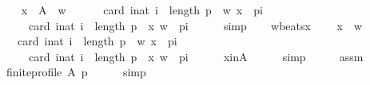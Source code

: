 \begin{isabellebody}
\ \ \isamarkupfalse%
\isanewline
\ \ \ \ {\isachardoublequoteopen}{\isacharparenleft}{\kern0pt}{\isasymforall}x\ {\isasymin}\ A\ {\isacharminus}{\kern0pt}\ {\isacharbraceleft}{\kern0pt}w{\isacharbraceright}{\kern0pt}{\isachardot}{\kern0pt}\isanewline
\ \ \ \ \ \ card\ {\isacharbraceleft}{\kern0pt}i{\isacharcolon}{\kern0pt}{\isacharcolon}{\kern0pt}nat{\isachardot}{\kern0pt}\ i\ {\isacharless}{\kern0pt}\ length\ p\ {\isasymand}\ {\isacharparenleft}{\kern0pt}w{\isacharcomma}{\kern0pt}\ x{\isacharparenright}{\kern0pt}\ {\isasymin}\ p{\isacharbang}{\kern0pt}i{\isacharbraceright}{\kern0pt}\ {\isacharless}{\kern0pt}\isanewline
\ \ \ \ \ \ \ \ card\ {\isacharbraceleft}{\kern0pt}i{\isacharcolon}{\kern0pt}{\isacharcolon}{\kern0pt}nat{\isachardot}{\kern0pt}\ i\ {\isacharless}{\kern0pt}\ length\ p\ {\isasymand}\ {\isacharparenleft}{\kern0pt}x{\isacharcomma}{\kern0pt}\ w{\isacharparenright}{\kern0pt}\ {\isasymin}\ p{\isacharbang}{\kern0pt}i{\isacharbraceright}{\kern0pt}{\isacharparenright}{\kern0pt}{\isachardoublequoteclose}\isanewline
\ \ \ \ \isamarkupfalse%
\ simp\isanewline
\ \ \isamarkupfalse%
\ w{\isacharunderscore}{\kern0pt}beats{\isacharunderscore}{\kern0pt}x{\isacharcolon}{\kern0pt}\isanewline
\ \ \ \ {\isachardoublequoteopen}x\ {\isasymnoteq}\ w\ {\isasymLongrightarrow}\isanewline
\ \ \ \ \ \ card\ {\isacharbraceleft}{\kern0pt}i{\isacharcolon}{\kern0pt}{\isacharcolon}{\kern0pt}nat{\isachardot}{\kern0pt}\ i\ {\isacharless}{\kern0pt}\ length\ p\ {\isasymand}\ {\isacharparenleft}{\kern0pt}w{\isacharcomma}{\kern0pt}\ x{\isacharparenright}{\kern0pt}\ {\isasymin}\ p{\isacharbang}{\kern0pt}i{\isacharbraceright}{\kern0pt}\ {\isacharless}{\kern0pt}\isanewline
\ \ \ \ \ \ \ \ card\ {\isacharbraceleft}{\kern0pt}i{\isacharcolon}{\kern0pt}{\isacharcolon}{\kern0pt}nat{\isachardot}{\kern0pt}\ i\ {\isacharless}{\kern0pt}\ length\ p\ {\isasymand}\ {\isacharparenleft}{\kern0pt}x{\isacharcomma}{\kern0pt}\ w{\isacharparenright}{\kern0pt}\ {\isasymin}\ p{\isacharbang}{\kern0pt}i{\isacharbraceright}{\kern0pt}{\isachardoublequoteclose}\isanewline
\ \ \ \ \isamarkupfalse%
\ x{\isacharunderscore}{\kern0pt}in{\isacharunderscore}{\kern0pt}A\isanewline
\ \ \ \ \isamarkupfalse%
\ simp\isanewline
\ \ \isamarkupfalse%
\ \isamarkupfalse%
\ assm\ \isamarkupfalse%
\isanewline
\ \ \ \ {\isachardoublequoteopen}finite{\isacharunderscore}{\kern0pt}profile\ A\ p{\isachardoublequoteclose}\isanewline
\ \ \ \ \isamarkupfalse%
\ simp\isanewline
\ \ \isamarkupfalse%

\end{isabellebody}
